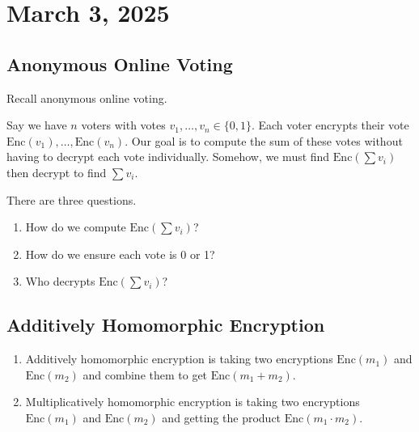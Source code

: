 \section{March 3, 2025}
\label{20250303}

\subsection{Anonymous Online Voting}

Recall anonymous online voting.

Say we have $n$ voters with votes $v_1, \dots, v_n \in \{ 0, 1\}$. Each voter encrypts their vote $\text{Enc}(v_1), \dots, \text{Enc}(v_n)$. Our goal is to compute the sum of these votes without having to decrypt each vote individually. Somehow, we must find $\text{Enc}(\sum v_i)$ then decrypt to find $\sum v_i$.

There are three questions.
\begin{enumerate}
    \item How do we compute $\text{Enc}(\sum v_i)$?
    \item How do we ensure each vote is 0 or 1?
    \item Who decrypts $\text{Enc}(\sum v_i)$?
\end{enumerate}

\subsection{Additively Homomorphic Encryption}

\begin{enumerate}
    \item Additively homomorphic encryption is taking two encryptions $\text{Enc}(m_1)$ and $\text{Enc}(m_2)$ and combine them to get $\text{Enc}(m_1 + m_2)$.
    \item Multiplicatively homomorphic encryption is taking two encryptions $\text{Enc}(m_1)$ and $\text{Enc}(m_2)$ and getting the product $\text{Enc}(m_1 \cdot m_2)$.
\end{enumerate}

